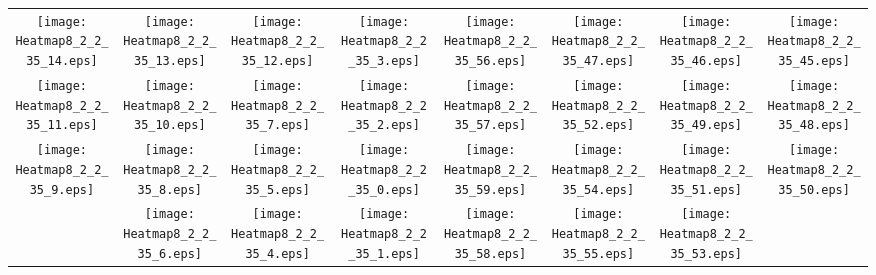 \documentclass{standalone}
\begin{document}
\begin{tabular}{ *8{c} }
\texttt{[image: Heatmap8\_2\_2\_35\_14.eps]} & \texttt{[image: Heatmap8\_2\_2\_35\_13.eps]} & \texttt{[image: Heatmap8\_2\_2\_35\_12.eps]} & \texttt{[image: Heatmap8\_2\_2\_35\_3.eps]} & \texttt{[image: Heatmap8\_2\_2\_35\_56.eps]} & \texttt{[image: Heatmap8\_2\_2\_35\_47.eps]} & \texttt{[image: Heatmap8\_2\_2\_35\_46.eps]} & \texttt{[image: Heatmap8\_2\_2\_35\_45.eps]} \\
\texttt{[image: Heatmap8\_2\_2\_35\_11.eps]} & \texttt{[image: Heatmap8\_2\_2\_35\_10.eps]} & \texttt{[image: Heatmap8\_2\_2\_35\_7.eps]} & \texttt{[image: Heatmap8\_2\_2\_35\_2.eps]} & \texttt{[image: Heatmap8\_2\_2\_35\_57.eps]} & \texttt{[image: Heatmap8\_2\_2\_35\_52.eps]} & \texttt{[image: Heatmap8\_2\_2\_35\_49.eps]} & \texttt{[image: Heatmap8\_2\_2\_35\_48.eps]} \\
\texttt{[image: Heatmap8\_2\_2\_35\_9.eps]} & \texttt{[image: Heatmap8\_2\_2\_35\_8.eps]} & \texttt{[image: Heatmap8\_2\_2\_35\_5.eps]} & \texttt{[image: Heatmap8\_2\_2\_35\_0.eps]} & \texttt{[image: Heatmap8\_2\_2\_35\_59.eps]} & \texttt{[image: Heatmap8\_2\_2\_35\_54.eps]} & \texttt{[image: Heatmap8\_2\_2\_35\_51.eps]} & \texttt{[image: Heatmap8\_2\_2\_35\_50.eps]} \\
 & \texttt{[image: Heatmap8\_2\_2\_35\_6.eps]} & \texttt{[image: Heatmap8\_2\_2\_35\_4.eps]} & \texttt{[image: Heatmap8\_2\_2\_35\_1.eps]} & \texttt{[image: Heatmap8\_2\_2\_35\_58.eps]} & \texttt{[image: Heatmap8\_2\_2\_35\_55.eps]} & \texttt{[image: Heatmap8\_2\_2\_35\_53.eps]} &  
\end{tabular}
\end{document}
